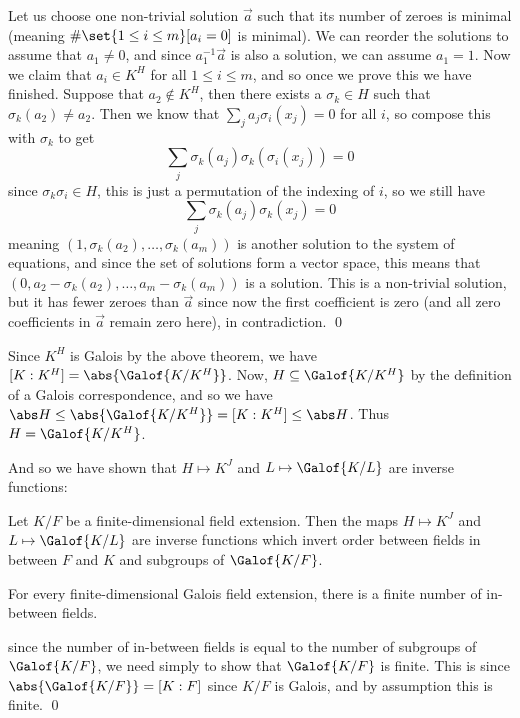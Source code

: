 Let us choose one non-trivial solution $\vec a$ such that its number of zeroes is minimal (meaning $\#\set{1\leq i\leq m}[a_i=0]$ is minimal).
We can reorder the solutions to assume that $a_1\neq0$, and since $a_1^{-1}\vec a$ is also a solution, we can assume $a_1=1$.
Now we claim that $a_i\in K^H$ for all $1\leq i\leq m$, and so once we prove this we have finished.
Suppose that $a_2\notin K^H$, then there exists a $\sigma_k\in H$ such that $\sigma_k(a_2)\neq a_2$.
Then we know that $\sum_ja_j\sigma_i(x_j)=0$ for all $i$, so compose this with $\sigma_k$ to get
$$ \sum_j\sigma_k(a_j)\sigma_k(\sigma_i(x_j)) = 0 $$
since $\sigma_k\sigma_i\in H$, this is just a permutation of the indexing of $i$, so we still have
$$ \sum_j\sigma_k(a_j)\sigma_k(x_j) = 0 $$
meaning $(1,\sigma_k(a_2),\dots,\sigma_k(a_m))$ is another solution to the system of equations, and since the set of solutions form a vector space, this means that
$(0,a_2-\sigma_k(a_2),\dots,a_m-\sigma_k(a_m))$ is a solution.
This is a non-trivial solution, but it has fewer zeroes than $\vec a$ since now the first coefficient is zero (and all zero coefficients in $\vec a$ remain zero here), in contradiction.
\qed

Since $K^H$ is Galois by the above theorem, we have $[K:K^H]=\abs{\Galof{K/K^H}}$.
Now, $H\subseteq\Galof{K/K^H}$ by the definition of a Galois correspondence, and so we have $\abs H\leq\abs{\Galof{K/K^H}}=[K:K^H]\leq\abs H$.
Thus $H=\Galof{K/K^H}$.

And so we have shown that $H\mapsto K^J$ and $L\mapsto\Galof{K/L}$ are inverse functions:

\bthrm[title=The Fundamental Theorem of Galois Theory, name=ftgalois]

    Let $K/F$ be a finite-dimensional field extension.
    Then the maps $H\mapsto K^J$ and $L\mapsto\Galof{K/L}$ are inverse functions which invert order between fields in between $F$ and $K$ and subgroups of $\Galof{K/F}$.

\ethrm

\bcoro

    For every finite-dimensional Galois field extension, there is a finite number of in-between fields.

\ecoro

\Proof since the number of in-between fields is equal to the number of subgroups of $\Galof{K/F}$, we need simply to show that $\Galof{K/F}$ is finite.
This is since $\abs{\Galof{K/F}}=[K:F]$ since $K/F$ is Galois, and by assumption this is finite.
\qed

